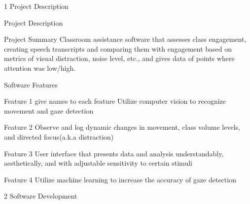 \documentclass[12pt]{article}
\begin{document}
\begin{flushleft} \large
1   Project Description 
\end{flushleft}
\begin{sectionbox}[colback=white]{Project Description}
\begin{subsectionbox}[colback=white]{Project Summary}
Classroom assistance software that assesses class engagement, creating speech
transcripts and comparing them with engagement based on metrics of visual distraction, noise level, etc., and gives data of points where attention was low/high.
\end{subsectionbox}

\begin{subsectionbox}[colback=white]{Software Features}
\begin{featurebox}[colback=white]{Feature 1 give names to each feature}
Utilize computer vision to recognize movement and gaze detection
\end{featurebox}
\begin{featurebox}[colback=white]{Feature 2}
Observe and log dynamic changes in movement, class volume levels, and directed focus(a.k.a distraction)
\end{featurebox}
\begin{featurebox}[colback=white]{Feature 3}
User interface that presents data and analysis understandably, aesthetically, and with adjustable sensitivity to certain stimuli
\end{featurebox}
\begin{featurebox}[colback=white]{Feature 4}
Utilize machine learning to increase the accuracy of gaze detection
\end{featurebox}
\end{subsectionbox}
\end{sectionbox}
\newpage
\begin{flushleft} \large
2    Software Development
\end{flushleft}
\end{document}
